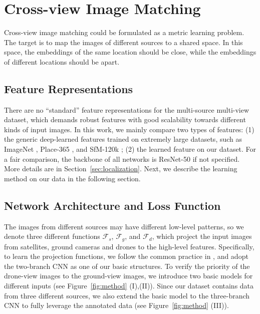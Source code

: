 \documentclass[sigconf]{acmart}
\begin{document}
\section{Cross-view Image Matching} \label{method}
Cross-view image matching could be formulated as a metric learning problem. The target is to map the images of different sources to a shared space. In this space, the embeddings of the same location should be close, while the embeddings of different locations should be apart. 

\subsection{Feature Representations}
There are no ``standard'' feature representations for the multi-source multi-view dataset, which demands robust features with good scalability towards different kinds of input images. In this work, we mainly compare two types of features: (1) the generic deep-learned features trained on extremely large datasets, such as ImageNet \cite{deng2009imagenet}, Place-365 \cite{zhou2017places}, and SfM-120k \cite{radenovic2018fine};  (2) the learned feature on our dataset. For a fair comparison, the backbone of all networks is ResNet-50 \cite{he2016deep} if not specified. More details are in Section~\ref{sec:localization}. Next, we describe the learning method on our data in the following section.

\subsection{Network Architecture and Loss Function}
The images from different sources may have different low-level patterns, so we denote three different functions $\mathcal{F}_s$, $\mathcal{F}_g$, and $\mathcal{F}_d$, which project the input images from satellites, ground cameras and drones to the high-level features. Specifically, to learn the projection functions, we follow the common practice in \cite{lin2015learning,liu2019lending}, and adopt the two-branch CNN as one of our basic structures. To verify the priority of the drone-view images to the ground-view images, we introduce two basic models for different inputs (see Figure~\ref{fig:method} (I),(II)). 
Since our dataset contains data from three different sources, we also extend the basic model to the three-branch CNN to fully leverage the annotated data (see Figure~\ref{fig:method} (III)). 
\end{document}
